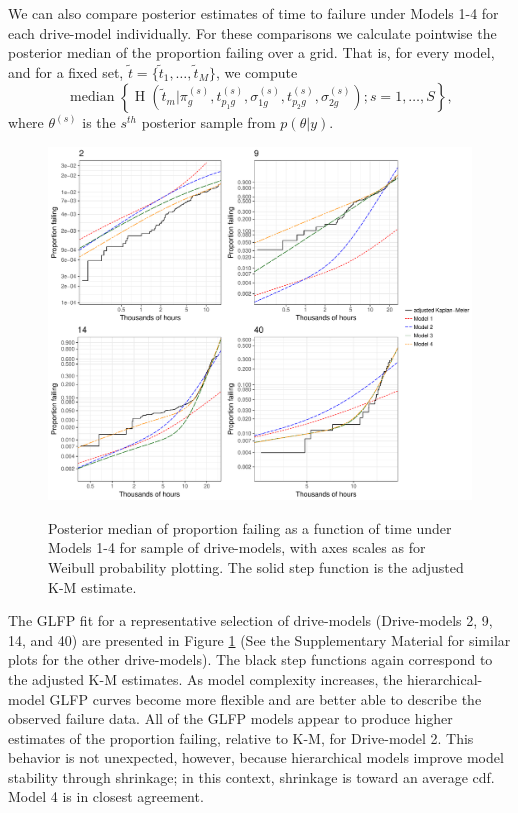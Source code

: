 \documentclass[12pt]{article}
\newcommand{\op}{\operatorname}
\begin{document}
We can also compare posterior estimates of time to failure under Models 1-4 for each drive-model individually.  For these comparisons we calculate pointwise the posterior median of the proportion failing over a grid. That is, for every model, and for a fixed set, $\tilde{t}=\{\tilde{t}_1,\ldots,\tilde{t}_M\}$, we compute 
\begin{equation}
\label{pointwise-medians}
\op{median}\left\{\op{H}\left(\tilde{t}_m|\pi_{g}^{(s)},t_{p_{1}g}^{(s)},\sigma_{1g}^{(s)},t_{p_{2}g}^{(s)},\sigma_{2g}^{(s)}\right);s=1,\ldots,S \right\},
\end{equation}
where $\theta^{(s)}$ is the $s^{th}$ posterior sample from $p(\theta|y)$.

\begin{figure}[H]
{\centering
\includegraphics[width=\textwidth]{single-drive-4-Models-ex}}
\caption{Posterior median of proportion failing as a function of time under Models 1-4 for sample of drive-models, with axes scales as for Weibull probability plotting.  The solid step function is the adjusted K-M estimate.}
\label{fig:mod_comp_leg}
\end{figure}

The GLFP fit for a representative selection of drive-models (Drive-models 2, 9, 14, and 40) are presented in Figure \ref{fig:mod_comp_leg} (See the Supplementary Material for similar plots for the other drive-models).  The black step functions again correspond to the adjusted K-M estimates.  As model complexity increases, the hierarchical-model GLFP curves become more flexible and are better able to describe the observed failure data.  All of the GLFP models appear to produce higher estimates of the proportion failing, relative to K-M, for Drive-model 2. This behavior is not unexpected, however, because hierarchical models improve model stability through shrinkage; in this context, shrinkage is toward an average cdf. Model 4 is in closest agreement. 
\end{document}

